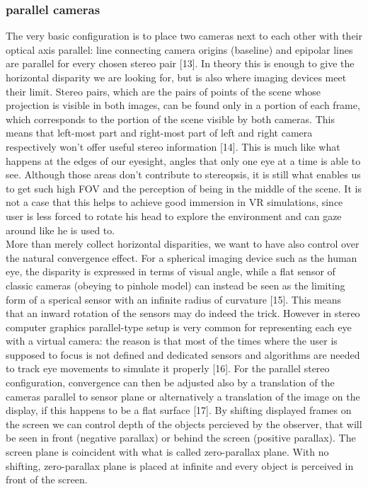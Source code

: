 \subsubsection{parallel cameras}
The very basic configuration is to place two cameras next to each other with their optical axis parallel: line connecting camera origins (baseline) and epipolar lines are parallel for every chosen stereo pair [13]. In theory this is enough to give the horizontal disparity we are looking for, but is also where imaging devices meet their limit. Stereo pairs, which are the pairs of points of the scene whose projection is visible in both images, can be found only in a portion of each frame, which corresponds to the portion of the scene visible by both cameras. This means that left-most part and right-most part of left and right camera respectively won’t offer useful stereo information [14]. This is much like what happens at the edges of our eyesight, angles that only one eye at a time is able to see. Although those areas don’t contribute to stereopsis, it is still what enables us to get such high FOV and the perception of being in the middle of the scene. It is not a case that this helps to achieve good immersion in VR simulations, since user is less forced to rotate his head to explore the environment and can gaze around like he is used to.\\
More than merely collect horizontal disparities, we want to have also control over the natural convergence effect. For a spherical imaging device such as the human eye, the disparity is expressed in terms of visual angle, while a flat sensor of classic cameras (obeying to pinhole model) can instead be seen as the limiting form of a sperical sensor with an infinite radius of curvature [15]. This means that an inward rotation of the sensors may do indeed the trick. However in stereo computer graphics parallel-type setup is very common for representing each eye with a virtual camera: the reason is that most of the times where the user is supposed to focus is not defined and dedicated sensors and algorithms are needed to track eye movements to simulate it properly [16]. For the parallel stereo configuration, convergence can then be adjusted also by a translation of the cameras parallel to sensor plane or alternatively a translation of the image on the display, if this happens to be a flat surface [17]. By shifting displayed frames on the screen we can control depth of the objects percieved by the observer, that will be seen in front (negative parallax) or behind the screen (positive parallax). The screen plane is coincident with what is called zero-parallax plane. With no shifting, zero-parallax plane is placed at infinite and every object is perceived in front of the screen.\\
